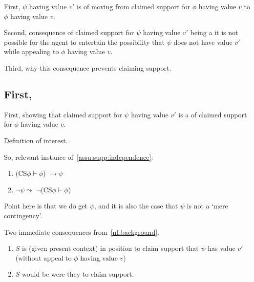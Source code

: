 \begin{note}
  First, \(\psi\) having value \(v'\) is \requ{} of moving from claimed support for \(\phi\) having value \(v\) to \(\phi\) having value \(v\).

  Second, consequence of claimed support for \(\psi\) having value \(v'\) being a \requ{} it is not possible for the agent to entertain the possibility that \(\psi\) does not have value \(v'\) while appealing to \(\phi\) having value \(v\).

  Third, why this consequence prevents claiming support.
\end{note}

\subsection{First, \requ{}}

\begin{note}
  First, showing that claimed support for \(\psi\) having value \(v'\) is a \requ{} of claimed support for \(\phi\) having value \(v\).

  \begin{note}
    Definition of interest.
    \begin{quote}
      \vspace{-\baselineskip}
    \end{quote}
  \end{note}
\end{note}

\begin{note}
  So, relevant instance of~\autoref{assu:supp:independence}:
  \begin{enumerate}
  \item (\(\text{CS}\phi \vdash \phi\)) \(\rightarrow \psi\)
  \item \(\lnot\psi \leadsto\) \(\lnot\)(\(\text{CS}\phi \vdash \phi\))
  \end{enumerate}

  Point here is that we do get \(\psi\), and it is also the case that \(\psi\) is not a `mere contingency'.
\end{note}

\begin{note}
  Two immediate consequences from~\ref{nI:background}.
  \begin{enumerate}
  \item \(S\) is (given present context) in position to claim support that \(\psi\) has value \(v'\) (without appeal to \(\phi\) having value \(v\))
  \item \(S\) would be \nmom{} were they to claim support.
  \end{enumerate}
\end{note}

